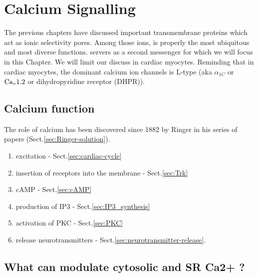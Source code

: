 

\chapter{Calcium Signalling}
\label{chap:calcium-signalling}


\def\IPthreeR{{\text{IP}_3\text{R}}}

The previous chapters have discussed important transmembrane proteins
which act as ionic selectivity pores. Among those ions,  is
properly the most ubiquitous and most diverse functions. 
servers as a second messenger for which we will focus in this
Chapter. We will limit our discuss in cardiac myocytes.  Reminding
that in cardiac myocytes, the dominant calcium ion channels is L-type
(aka $\alpha_{1C}$ or $\ce{Ca}_v1.2$ or dihydropyridine receptor
(DHPR)).

\section{Calcium function}
\label{sec:calcium-function}

The role of calcium has been discovered since 1882 by Ringer in his series of
papers (Sect.\ref{sec:Ringer-solution}). 

\begin{enumerate}
  \item excitation - Sect.\ref{sec:cardiac-cycle}
  
  \item insertion of receptors into the membrane - Sect.\ref{sec:Trk}
  
  \item cAMP - Sect.\ref{sec:cAMP}
  
  \item production of IP3 - Sect.\ref{sec:IP3_synthesis}
  
  \item activation of PKC - Sect.\ref{sec:PKC}
  
  \item release neurotransmitters - Sect.\ref{sec:neurotransmitter-release}.
  
\end{enumerate}

\section{What can modulate cytosolic and SR Ca2+ ?}

